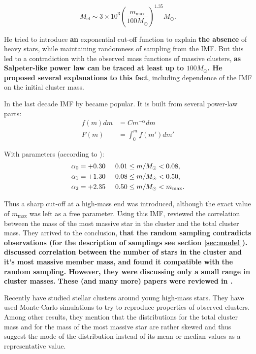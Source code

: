 \documentclass{aastex}
\newcommand{\MSun}{M_\odot}
\newcommand{\Mmax}{m_{\mathrm{max}}}
\newcommand{\Mcl}{M_{\mathrm{cl}}}
\begin{document}
\begin{equation}
  \Mcl \sim 3 \times 10^3 \left( \frac{\Mmax}{100 \MSun} \right) ^{1.35} \MSun.
\end{equation}

He tried to introduce \textbf{an} exponential cut-off function to explain \textbf{the absence} of heavy stars, while maintaining randomness of sampling from the IMF. But this led to a contradiction with the observed mass functions of massive clusters, \textbf{as Salpeter-like power law can be traced at least up to $100 \MSun$. He proposed} \textbf{several explanations to 
this fact}, including dependence of the IMF on the initial cluster mass.

In the last decade IMF by \citet{Kroupa2001} became popular.  
It is built from several power-law parts:
\begin{align} \label{eq:spectrum}
 f(m)dm &= C m^{-\alpha} dm  \nonumber \\
 F(m) &= \int_0^{m} f(m')dm'
\end{align} 

With parameters (according to \citet{Kroupa2001}):
\begin{align} %
  \alpha_0 = +0.30 &\hspace{0.5cm} 0.01 \leq m/\MSun < 0.08, \nonumber \\
  \alpha_1 = +1.30 &\hspace{0.5cm}  0.08 \leq m/\MSun < 0.50, \\
  \alpha_2 = +2.35 &\hspace{0.5cm}  0.50 \leq m/\MSun < \Mmax. \nonumber 
\end{align} 

Thus a sharp cut-off at a high-mass end was introduced, although the exact value of $\Mmax$ was left as a free parameter.
Using this IMF, \citet{Origin} reviewed the correlation between the mass of the most massive star in the cluster and the total cluster mass. They arrived to the conclusion, \textbf{that the random sampling contradicts observations (for the description of samplings} \textbf{see section \ref{sec:model}).
\citet{MassFromN} discussed correlation between the number} \textbf{of stars in the cluster and it's most massive member mass, and found it compatible with} \textbf{the random sampling. However, they were discussing only a small range in cluster masses.} \textbf{These (and many more) papers were reviewed in \citet{Kroupa2010}.}

Recently \citet{Faustini} have studied stellar clusters around young high-mass stars. They have used Monte-Carlo simulations to 
try to reproduce properties of observed clusters. Among other results, they mention that the distributions for the total cluster mass
and for the mass of the most massive star are rather skewed and thus suggest the mode of the distribution instead of its mean or median values as a representative value.
\end{document}
